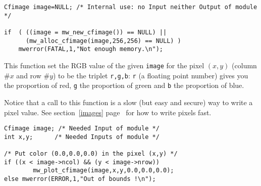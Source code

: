 \Next
\Example
\begin{verbatim}
Cfimage image=NULL; /* Internal use: no Input neither Output of module */

if  ( ((image = mw_new_cfimage()) == NULL) ||
      (mw_alloc_cfimage(image,256,256) == NULL) )
    mwerror(FATAL,1,"Not enough memory.\n");
\end{verbatim}

\newpage %
\Description
This function set the RGB value of the given \verb+image+ for the pixel $(x,y)$ (column $\# x$ and row $\# y$) to be the triplet \verb+r,g,b+:
\verb+r+ (a floating point number) gives you the proportion of red, \verb+g+ the proportion of green and \verb+b+ the proportion of blue.

Notice that a call to this function is a slow (but easy and secure) way to 
write a pixel value.
See section~\ref{images} page~\pageref{images} for how to write pixels fast.

\Next
\Example
\begin{verbatim}
Cfimage image; /* Needed Input of module */
int x,y;      /* Needed Inputs of module */

/* Put color (0.0,0.0,0.0) in the pixel (x,y) */
if ((x < image->ncol) && (y < image->nrow))
        mw_plot_cfimage(image,x,y,0.0,0.0,0.0);
else mwerror(ERROR,1,"Out of bounds !\n");

\end{verbatim}

\newpage %
